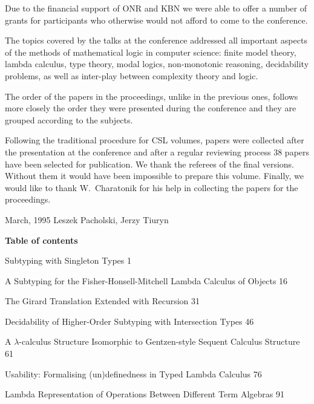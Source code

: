 Due to the financial support of ONR and KBN we were able to offer a number of grants for participants who otherwise would not afford to come to the conference.

The topics covered by the talks at the conference addressed all important aspects of the methods of mathematical logic in computer science: finite model theory, lambda calculus, type theory, modal logics, non-monotonic reasoning, decidability problems, as well as inter-play between complexity theory and logic. 

The order of the papers in the proceedings, unlike in the previous ones, follows more closely the order they were presented during the conference and they are grouped according to the subjects. 

Following the traditional procedure for CSL volumes, papers were collected after the presentation at the conference and after a regular reviewing process 38 papers have been selected for publication. We thank the referees of the final versions. Without them it would have been impossible to prepare this volume. Finally, we would like to thank W.~Charatonik for his help in collecting the papers for the proceedings.
\vskip0.5in


March, 1995 \hfill	Leszek Pacholski, Jerzy Tiuryn

\vfill\eject



\begin{center}
{\Large \bf Table of contents}\\[.5cm]
\end{center}



{Subtyping with Singleton Types}
{1}

{A Subtyping for the Fisher-Honsell-Mitchell Lambda Calculus of Objects} {16}

{The Girard Translation Extended with Recursion} {31}

{Decidability of Higher-Order Subtyping with Intersection Types} {46}

{A $\lambda$-calculus Structure Isomorphic to Gentzen-style Sequent Calculus Structure}
{61}

{Usability: Formalising (un)definedness in Typed Lambda Calculus} {76}


{Lambda Representation of Operations Between Different Term Algebras} {91}


